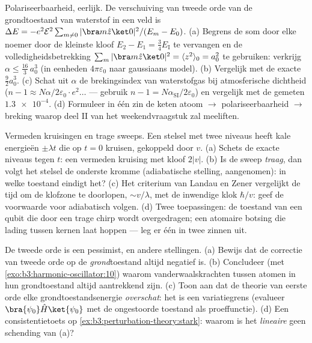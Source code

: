\begin{exercise}[$\star\star\star$]\label{exo:b3:perturbation-theory:10}
Polariseerbaarheid, eerlijk. De verschuiving van tweede orde van de
grondtoestand van waterstof in een veld is $\Delta E = -e^2\mathcal E^2\sum_{m\neq
0}|\bra m\hat z\ket 0|^2/(E_m - E_0)$. (a) Begrens de som
door elke noemer door de kleinste kloof $E_2 - E_1 =
\tfrac34 E_{\text{I}}$ te vervangen en de volledigheidsbetrekking $\sum_m|\bra
m\hat z\ket0|^2 = \langle z^2\rangle_0 = a_0^2$ te gebruiken: verkrijg
$\alpha
\le \tfrac{16}3\,a_0^3$ (in eenheden $4\pi\varepsilon_0$ naar
gaussiaans model). (b) Vergelijk met de exacte $\tfrac92 a_0^3$. (c) Schat
uit $\alpha$ de brekingsindex van waterstofgas bij atmosferische dichtheid
($n - 1 \approx N\alpha/2\varepsilon_0
\cdot e^2\dots$ --- gebruik $n - 1 = N\alpha_{\text{SI}}/2
\varepsilon_0$) en vergelijk met de gemeten
$\num{1.3e-4}$. (d) Formuleer in één zin de keten atoom $\to$
polariseerbaarheid $\to$ breking waarop deel II van het weekendvraagstuk
zal meeliften.
\end{exercise}

\begin{exercise}[$\star\star\star$]\label{exo:b3:perturbation-theory:11}
Vermeden kruisingen en trage sweeps. Een stelsel met twee niveaus heeft
kale energieën $\pm\lambda t$ die op $t = 0$ kruisen, gekoppeld door $v$.
(a) Schets de exacte niveaus tegen $t$: een vermeden kruising met kloof
$2|v|$. (b) Is de sweep \emph{traag}, dan volgt het stelsel de onderste
kromme (adiabatische stelling, aangenomen): in welke toestand eindigt het?
(c) Het criterium van Landau en Zener vergelijkt de tijd om de klofzone te
doorlopen, $\sim v/\lambda$, met de inwendige klok $\hbar/v$: geef de
voorwaarde voor adiabatisch volgen. (d) Twee toepassingen: de toestand van
een qubit die door een trage chirp wordt overgedragen; een atomaire
botsing die lading tussen kernen laat hoppen --- leg er één in twee zinnen
uit.
\end{exercise}

\begin{exercise}[$\star\star\star$]\label{exo:b3:perturbation-theory:12}
De tweede orde is een pessimist, en andere stellingen. (a) Bewijs dat de
correctie van tweede orde op de \emph{grond}toestand altijd negatief is.
(b) Concludeer (met \cref{exo:b3:harmonic-oscillator:10}) waarom
vanderwaalskrachten tussen atomen in hun grondtoestand altijd aantrekkend
zijn. (c) Toon aan dat de theorie van eerste orde elke grondtoestandsenergie
\emph{overschat}: het is een variatiegrens (evalueer $\bra{\psi_0}\hat
H\ket{\psi_0}$ met de ongestoorde toestand als proeffunctie). (d) Een
consistentietoets op \cref{ex:b3:perturbation-theory:stark}: waarom is het
\emph{lineaire}  geen schending van (a)?
\end{exercise}

